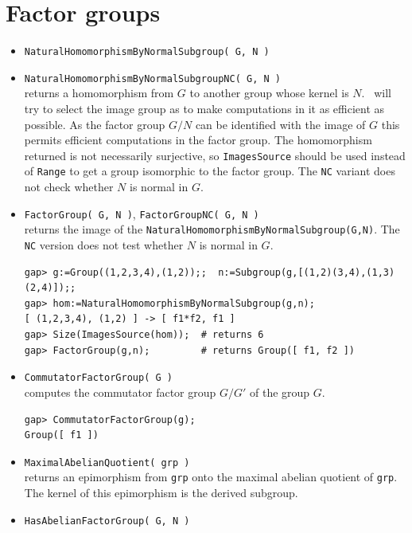 \section{Factor groups\protect\footnotemark}  
\begin{itemize}
\item {\tt NaturalHomomorphismByNormalSubgroup( G, N )}
\item {\tt NaturalHomomorphismByNormalSubgroupNC( G, N )}\\[2pt] 
returns a homomorphism from $G$ to another group whose kernel is $N$. \gap\ will try to select the image
group as to make computations in it as efficient as possible. As the factor group $G/N$ can be identified with
the image of $G$ this permits efficient computations in the factor group. The homomorphism returned is not
necessarily surjective, so {\tt ImagesSource} should be used instead of {\tt Range} to get a group isomorphic to the
factor group. The {\tt NC} variant does not check whether $N$ is normal in $G$.
\item {\tt FactorGroup( G, N )}, {\tt FactorGroupNC( G, N )}\\[2pt] 
returns the image of the {\tt NaturalHomomorphismByNormalSubgroup(G,N)}. The {\tt NC} version does not test
whether $N$ is normal in $G$.
{\codesize
\begin{verbatim}
gap> g:=Group((1,2,3,4),(1,2));;  n:=Subgroup(g,[(1,2)(3,4),(1,3)(2,4)]);;
gap> hom:=NaturalHomomorphismByNormalSubgroup(g,n);
[ (1,2,3,4), (1,2) ] -> [ f1*f2, f1 ]
gap> Size(ImagesSource(hom));  # returns 6
gap> FactorGroup(g,n);         # returns Group([ f1, f2 ])
\end{verbatim}}
\item {\tt CommutatorFactorGroup( G )}\\[2pt] 
computes the commutator factor group $G/G'$ of the group $G$.
{\codesize
\begin{verbatim}
gap> CommutatorFactorGroup(g);
Group([ f1 ])
\end{verbatim}}
\item {\tt MaximalAbelianQuotient( grp )}\\[2pt] 
returns an epimorphism from {\tt grp} onto the maximal abelian quotient of {\tt grp}. The kernel of this epimorphism
is the derived subgroup.
\item {\tt HasAbelianFactorGroup( G, N )}\\[2pt] 

\end{itemize}
